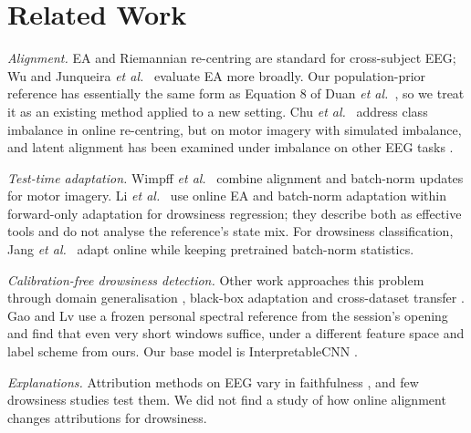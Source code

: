 \section{Related Work}
\label{sec:related}

\textit{Alignment.} EA \cite{he2020transfer} and Riemannian re-centring \cite{zanini2018transfer} are standard for cross-subject EEG; Wu \cite{wu2025revisiting} and Junqueira \textit{et al.}~\cite{junqueira2024systematic} evaluate EA more broadly. Our population-prior reference has essentially the same form as Equation 8 of Duan \textit{et al.}~\cite{duan2025online}, so we treat it as an existing method applied to a new setting. Chu \textit{et al.}~\cite{chu2026rectifying} address class imbalance in online re-centring, but on motor imagery with simulated imbalance, and latent alignment has been examined under imbalance on other EEG tasks \cite{latent2025}. 

\textit{Test-time adaptation.} Wimpff \textit{et al.}~\cite{wimpff2023calibration} combine alignment and batch-norm updates for motor imagery. Li \textit{et al.}~\cite{li2026backprop} use online EA and batch-norm adaptation within forward-only adaptation for drowsiness regression; they describe both as effective tools and do not analyse the reference's state mix. For drowsiness classification, Jang \textit{et al.}~\cite{jang2025calibration} adapt online while keeping pretrained batch-norm statistics.

\textit{Calibration-free drowsiness detection.} Other work approaches this problem through domain generalisation \cite{dg2023,manifold2024}, black-box adaptation \cite{spark2024} and cross-dataset transfer \cite{edjan2023}. Gao and Lv \cite{gao2026early} use a frozen personal spectral reference from the session's opening and find that even very short windows suffice, under a different feature space and label scheme from ours. Our base model is InterpretableCNN \cite{cui2022eeg}.

\textit{Explanations.} Attribution methods on EEG vary in faithfulness \cite{cui2023towards}, and few drowsiness studies test them. We did not find a study of how online alignment changes attributions for drowsiness.
